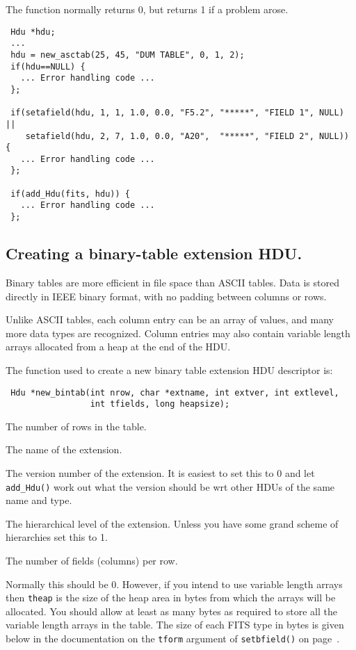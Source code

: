 The function normally returns 0, but returns 1 if a problem arose.

\begin{verbatim}
 Hdu *hdu;
 ...
 hdu = new_asctab(25, 45, "DUM TABLE", 0, 1, 2);
 if(hdu==NULL) {
   ... Error handling code ...
 };

 if(setafield(hdu, 1, 1, 1.0, 0.0, "F5.2", "*****", "FIELD 1", NULL) ||
    setafield(hdu, 2, 7, 1.0, 0.0, "A20",  "*****", "FIELD 2", NULL)) {
   ... Error handling code ...
 };

 if(add_Hdu(fits, hdu)) {
   ... Error handling code ...
 };
\end{verbatim}

\subsection{Creating a binary-table extension HDU.}

Binary tables are more efficient in file space than ASCII tables.
Data is stored directly in IEEE binary format, with no padding
between columns or rows.

Unlike ASCII tables, each column entry can be an array of values, and
many more data types are recognized. Column entries may also contain
variable length arrays allocated from a heap at the end of the HDU.

The function used to create a new binary table extension HDU
descriptor is:

\label{new_bintab}\begin{verbatim}
 Hdu *new_bintab(int nrow, char *extname, int extver, int extlevel,
                 int tfields, long heapsize);
\end{verbatim}
\begin{arglist}

 The number of rows in the table.

 The name of the extension.

 The version number of the extension. It is easiest to set
            this to 0 and let \verb`add_Hdu()` work out what the version
            should be wrt other HDUs of the same name and type.

 The hierarchical level of the extension. Unless you have
            some grand scheme of hierarchies set this to 1.

 The number of fields (columns) per row.

 Normally this should be 0. However, if you intend to use
            variable length arrays then \verb`theap` is the size of the heap
            area in bytes from which the arrays will be allocated. You
            should allow at least as many bytes as required to store
            all the variable length arrays in the table. The size of
            each FITS type in bytes is given below in the
            documentation on the \verb`tform` argument of
            \verb`setbfield()` on page~\pageref{setbfield}.
\end{arglist} 

